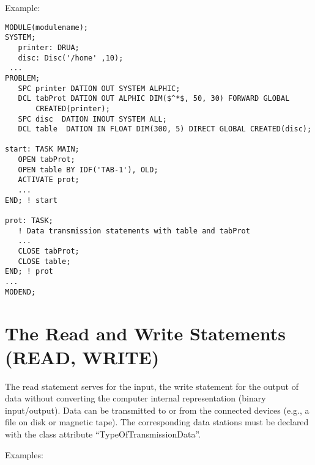 Example:
\label{example}

\begin{lstlisting}
MODULE(modulename);
SYSTEM;
   printer: DRUA;
   disc: Disc('/home' ,10);
 ... 
PROBLEM;
   SPC printer DATION OUT SYSTEM ALPHIC;
   DCL tabProt DATION OUT ALPHIC DIM($^*$, 50, 30) FORWARD GLOBAL
       CREATED(printer);
   SPC disc  DATION INOUT SYSTEM ALL;
   DCL table  DATION IN FLOAT DIM(300, 5) DIRECT GLOBAL CREATED(disc);

start: TASK MAIN;
   OPEN tabProt;
   OPEN table BY IDF('TAB-1'), OLD;
   ACTIVATE prot;
   ...
END; ! start

prot: TASK;
   ! Data transmission statements with table and tabProt
   ...
   CLOSE tabProt;
   CLOSE table; 
END; ! prot 
... 
MODEND;
\end{lstlisting}

\section{The Read and Write Statements (READ, WRITE)}   %
\label{sec_read_write}

The read statement serves for the input, the write statement for the
output of data without converting the computer internal representation
(binary input/output). Data can be transmitted to or from the connected
devices (e.g., a file on disk or magnetic tape). The corresponding data
stations must be declared with the class attribute
``TypeOfTransmissionData''.

Examples:

